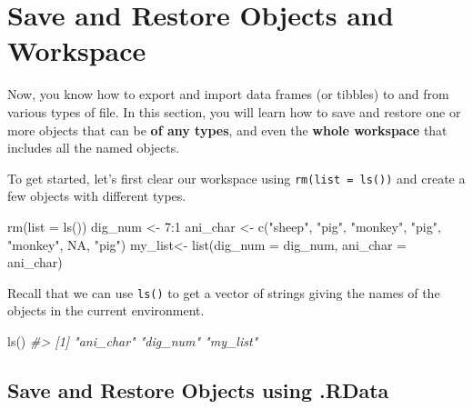 \documentclass[
]{book}
\newenvironment{Shaded}{\begin{snugshade}}{\end{snugshade}}
\newcommand{\AttributeTok}[1]{\textcolor[rgb]{0.77,0.63,0.00}{#1}}
\newcommand{\CommentTok}[1]{\textcolor[rgb]{0.56,0.35,0.01}{\textit{#1}}}
\newcommand{\ConstantTok}[1]{\textcolor[rgb]{0.00,0.00,0.00}{#1}}
\newcommand{\DecValTok}[1]{\textcolor[rgb]{0.00,0.00,0.81}{#1}}
\newcommand{\FunctionTok}[1]{\textcolor[rgb]{0.00,0.00,0.00}{#1}}
\newcommand{\NormalTok}[1]{#1}
\newcommand{\OtherTok}[1]{\textcolor[rgb]{0.56,0.35,0.01}{#1}}
\newcommand{\SpecialCharTok}[1]{\textcolor[rgb]{0.00,0.00,0.00}{#1}}
\newcommand{\StringTok}[1]{\textcolor[rgb]{0.31,0.60,0.02}{#1}}
\begin{document}
\hypertarget{save-object}{%
\section{Save and Restore Objects and Workspace}\label{save-object}}

Now, you know how to export and import data frames (or tibbles) to and from various types of file. In this section, you will learn how to save and restore one or more objects that can be \textbf{of any types}, and even the \textbf{whole workspace} that includes all the named objects.

To get started, let's first clear our workspace using \texttt{rm(list\ =\ ls())} and create a few objects with different types.

\begin{Shaded}
\begin{Highlighting}[]
\FunctionTok{rm}\NormalTok{(}\AttributeTok{list =} \FunctionTok{ls}\NormalTok{())}
\NormalTok{dig\_num }\OtherTok{\textless{}{-}} \DecValTok{7}\SpecialCharTok{:}\DecValTok{1}
\NormalTok{ani\_char }\OtherTok{\textless{}{-}} \FunctionTok{c}\NormalTok{(}\StringTok{"sheep"}\NormalTok{, }\StringTok{"pig"}\NormalTok{, }\StringTok{"monkey"}\NormalTok{, }\StringTok{"pig"}\NormalTok{, }\StringTok{"monkey"}\NormalTok{, }\ConstantTok{NA}\NormalTok{, }\StringTok{"pig"}\NormalTok{)}
\NormalTok{my\_list}\OtherTok{\textless{}{-}} \FunctionTok{list}\NormalTok{(}\AttributeTok{dig\_num =}\NormalTok{ dig\_num, }\AttributeTok{ani\_char =}\NormalTok{ ani\_char)}
\end{Highlighting}
\end{Shaded}

Recall that we can use \texttt{ls()} to get a vector of strings giving the names of the objects in the current environment.

\begin{Shaded}
\begin{Highlighting}[]
\FunctionTok{ls}\NormalTok{()}
\CommentTok{\#\textgreater{} [1] "ani\_char" "dig\_num"  "my\_list"}
\end{Highlighting}
\end{Shaded}

\hypertarget{save-and-restore-objects-using-.rdata}{%
\subsection{Save and Restore Objects using .RData}\label{save-and-restore-objects-using-.rdata}}
\end{document}
